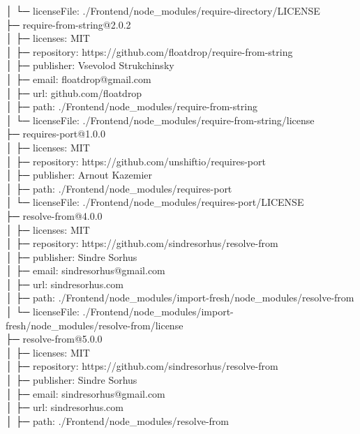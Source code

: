 \documentclass[
    paper=a4,
    twoside=false,
    parskip=half,
    listof=entryprefix,
    listof=totoc,
    index=totoc,
    bibliography=totoc,
    headsepline,
]{scrbook}
\begin{document}
    │  └─ licenseFile: ./Frontend/node\_modules/require-directory/LICENSE\\
    ├─ require-from-string@2.0.2\\
    │  ├─ licenses: MIT\\
    │  ├─ repository: https://github.com/floatdrop/require-from-string\\
    │  ├─ publisher: Vsevolod Strukchinsky\\
    │  ├─ email: floatdrop@gmail.com\\
    │  ├─ url: github.com/floatdrop\\
    │  ├─ path: ./Frontend/node\_modules/require-from-string\\
    │  └─ licenseFile: ./Frontend/node\_modules/require-from-string/license\\
    ├─ requires-port@1.0.0\\
    │  ├─ licenses: MIT\\
    │  ├─ repository: https://github.com/unshiftio/requires-port\\
    │  ├─ publisher: Arnout Kazemier\\
    │  ├─ path: ./Frontend/node\_modules/requires-port\\
    │  └─ licenseFile: ./Frontend/node\_modules/requires-port/LICENSE\\
    ├─ resolve-from@4.0.0\\
    │  ├─ licenses: MIT\\
    │  ├─ repository: https://github.com/sindresorhus/resolve-from\\
    │  ├─ publisher: Sindre Sorhus\\
    │  ├─ email: sindresorhus@gmail.com\\
    │  ├─ url: sindresorhus.com\\
    │  ├─ path: ./Frontend/node\_modules/import-fresh/node\_modules/resolve-from\\
    │  └─ licenseFile: ./Frontend/node\_modules/import-fresh/node\_modules/resolve-from/license\\
    ├─ resolve-from@5.0.0\\
    │  ├─ licenses: MIT\\
    │  ├─ repository: https://github.com/sindresorhus/resolve-from\\
    │  ├─ publisher: Sindre Sorhus\\
    │  ├─ email: sindresorhus@gmail.com\\
    │  ├─ url: sindresorhus.com\\
    │  ├─ path: ./Frontend/node\_modules/resolve-from\\
\end{document}
